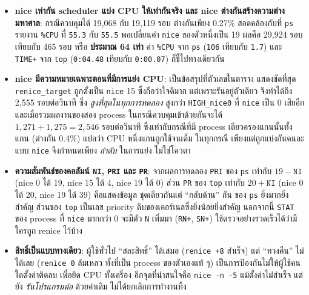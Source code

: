 \documentclass[a4paper,11pt]{article}
\newcommand{\code}[1]{\texttt{#1}}
\begin{document}
\begin{itemize}[leftmargin=*]
  \item \textbf{nice เท่ากัน scheduler แบ่ง CPU ให้เท่ากันจริง และ nice ต่างกันสร้างความต่างมหาศาล}:
        กรณีควบคุมได้ 19{,}068 กับ 19{,}119 รอบ ต่างกันเพียง 0.27\%
        สอดคล้องกับที่ \code{ps} รายงาน \code{\%CPU} ที่ \code{55.3} กับ \code{55.5}
        พอเปลี่ยนค่า \code{nice} ของตัวหนึ่งเป็น 19 ผลคือ 29{,}924 รอบ เทียบกับ 465 รอบ
        หรือ \textbf{ประมาณ 64 เท่า} ค่า \code{\%CPU} จาก \code{ps} (\code{106}
        เทียบกับ \code{1.7}) และ \code{TIME+} จาก \code{top} (\code{0:04.48}
        เทียบกับ \code{0:00.07}) ก็ชี้ไปทางเดียวกัน

  \item \textbf{nice มีความหมายเฉพาะตอนที่มีการแย่ง CPU}: เป็นข้อสรุปที่ตัวเลขในตาราง
        แสดงชัดที่สุด \code{renice\_target} ถูกตั้งเป็น \code{nice} 15 ซึ่งถือว่าใจดีมาก
        แต่เพราะรันอยู่ตัวเดียว จึงทำได้ถึง 2{,}555 รอบต่อวินาที ซึ่ง
        \emph{สูงที่สุดในทุกการทดลอง} สูงกว่า \code{HIGH\_nice0} ที่ \code{nice}
        เป็น 0 เสียอีก และเมื่อรวมผลงานของสอง process ในกรณีควบคุมเข้าด้วยกันจะได้
        $1{,}271 + 1{,}275 = 2{,}546$ รอบต่อวินาที ซึ่งเท่ากับกรณีที่มี process
        เดียวครองแกนนั้นทั้งแกน (ต่างกัน 0.4\%) แปลว่า CPU หนึ่งแกนถูกใช้จนเต็ม
        ในทุกกรณี เพียงแต่ถูกแบ่งกันคนละแบบ \code{nice} จึงกำหนดเพียง
        \emph{ลำดับ} ในการแย่ง ไม่ใช่โควตา

  \item \textbf{ความสัมพันธ์ของคอลัมน์ \code{NI}, \code{PRI} และ \code{PR}}:
        จากผลการทดลอง \code{PRI} ของ \code{ps} เท่ากับ $19 - \code{NI}$
        (nice 0 ได้ 19, nice 15 ได้ 4, nice 19 ได้ 0) ส่วน \code{PR} ของ \code{top}
        เท่ากับ $20 + \code{NI}$ (nice 0 ได้ 20, nice 19 ได้ 39) คือแสดงข้อมูล
        ชุดเดียวกันแต่ ``กลับด้าน'' กัน ของ \code{ps} ยิ่งมากยิ่งสำคัญ ส่วนของ
        \code{top} เป็นเลข priority ดิบของเคอร์เนลซึ่งยิ่งน้อยยิ่งสำคัญ
        นอกจากนี้ \code{STAT} ของ process ที่ \code{nice} มากกว่า 0 จะมีตัว \code{N}
        เพิ่มมา (\code{RN+}, \code{SN+}) ใช้ตรวจอย่างรวดเร็วได้ว่ามีใครถูก renice ไว้บ้าง

  \item \textbf{สิทธิ์เป็นแบบทางเดียว}: ผู้ใช้ทั่วไป ``สละสิทธิ์'' ได้เสมอ
        (\code{renice +8} สำเร็จ) แต่ ``ทวงคืน'' ไม่ได้เลย (\code{renice 0} ล้มเหลว
        ทั้งที่เป็น process ของตัวเองแท้ ๆ) เป็นการป้องกันไม่ให้ผู้ใช้คนใดตั้งค่าติดลบ
        เพื่อยึด CPU ทั้งเครื่อง อีกจุดที่น่าสนใจคือ \code{nice -n -5} แม้ตั้งค่าไม่สำเร็จ
        แต่ยัง \emph{รันโปรแกรมต่อ} ด้วยค่าเดิม ไม่ได้ยกเลิกการทำงานทิ้ง
\end{itemize}
\end{document}

